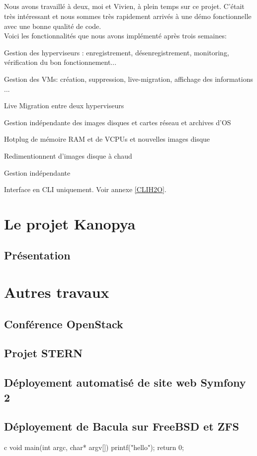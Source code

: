 \paragraph*{}
Nous avons travaillé à deux, moi et Vivien, à plein temps sur ce projet. C'était très intéressant et nous sommes très rapidement arrivés à une démo fonctionnelle avec une bonne
qualité de code.
\\
Voici les fonctionnalités que nous avons implémenté après trois semaines:
\begin{listi}
	\item Gestion des hyperviseurs : enregistrement, désenregistrement, monitoring, vérification du bon fonctionnement...
	\item Gestion des VMs: création, suppression, live-migration, affichage des informations ...
	\item Live Migration entre deux hyperviseurs
	\item Gestion indépendante des images disques et cartes réseau et archives d'OS
	\item Hotplug de mémoire RAM et de VCPUs et nouvelles images disque
	\item Redimentionnent d'images disque à chaud
	\item Gestion indépendante
	\item Interface en CLI uniquement. Voir annexe \ref{CLIH2O}.
\end{listi}




\chapter{Le projet Kanopya}

\section{Présentation}


\chapter{Autres travaux}

\section{Conférence OpenStack}

\section{Projet STERN}


\section{Déployement automatisé de site web Symfony 2}


\section{Déployement de Bacula sur FreeBSD et ZFS}


\begin{pygmented}{c}
void main(int argc, char* argv[])
{
	printf("hello");
	return 0;
}
\end{pygmented}

\cite{test}
